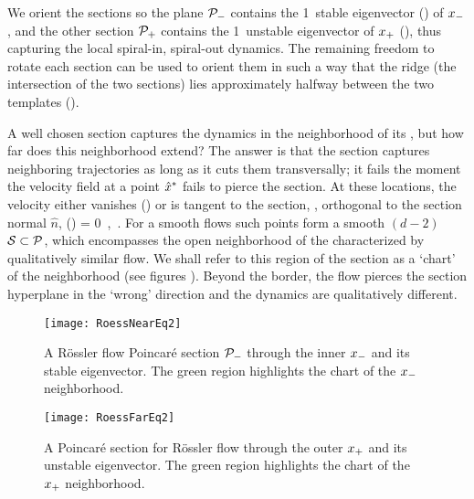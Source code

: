 We orient the sections so the plane ${\cal P}_{-}$ contains the 1\dmn\
stable eigenvector () of $x_{-}$, and the other section
${\cal P}_{+}$ contains the 1\dmn\ unstable eigenvector of $x_{+}$
(\reffig{fig:RoessFarEq}), thus capturing the local spiral-in,
spiral-out dynamics. The remaining freedom to rotate each section can be
used to orient them in such a way that the ridge (the intersection of
the two sections) lies approximately halfway between the two templates
(\reffig{fig:RoessBothEq}).

A well chosen section captures the dynamics in the neighborhood of its
\template, but how far does this neighborhood extend?
The answer is that the section captures neighboring trajectories as long
as it cuts them transversally; it fails the moment the velocity field at
a point $\hat{x}^\ast$ fails to pierce the section. At these locations, the
velocity either vanishes (\eqv) or is tangent to the section, \ie,
orthogonal to the section normal $\hat{n}$,
\beq
     \cdot \vel(\sspRSing) = 0
\,,\qquad
    \sspRSing \in {}
\,.
For a smooth flows such points form a smooth $(d\!-\!2)$\dmn\
\emph{\poincBord} ${\cal S} \subset {\cal P}$, which encompasses the open
neighborhood of the {\template} characterized by qualitatively similar
flow. We shall refer to this region of the section as a
`chart' of the {\template} neighborhood (see figures ). Beyond the border, the flow pierces the section hyperplane in the `wrong' direction and the dynamics are qualitatively different.


\begin{figure}%
\begin{center}
  \texttt{[image: RoessNearEq2]}
\end{center}
  \caption{\label{fig:RoessNearEq}
  A R\"ossler flow Poincar\'e section ${\cal P}_{-}$ through the inner
  {\eqv} $x_{-}$ and its stable eigenvector. The green region
  highlights the chart of the $x_{-}$ neighborhood.
}
\end{figure}

\begin{figure}%
\begin{center}
  \texttt{[image: RoessFarEq2]}
\end{center}
  \caption[R\"ossler section, outer {\eqv}]{
  A Poincar\'e section for R\"ossler flow through the outer {\eqv}
  $x_{+}$  and its unstable eigenvector. The green region highlights
  the chart of the $x_{+}$ neighborhood.
  } \label{fig:RoessFarEq}
\end{figure}

